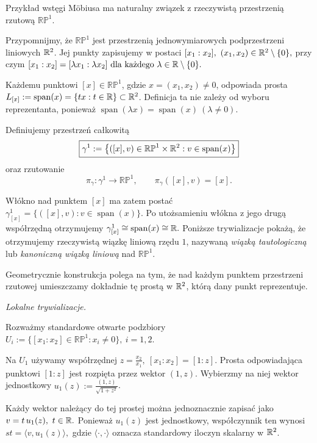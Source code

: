 \begin{przyklad}
\label{prz:tautologiczna-rp1}

Przykład wstęgi Möbiusa ma naturalny związek z rzeczywistą
przestrzenią rzutową $\mathbb{RP}^1$.

Przypomnijmy, że $\mathbb{RP}^1$ jest przestrzenią
jednowymiarowych podprzestrzeni liniowych $\mathbb{R}^2$.
Jej punkty zapisujemy w postaci
$
[x_1:x_2],
\ (x_1,x_2)\in\mathbb{R}^2\setminus\{0\},
$
przy czym
$
[x_1:x_2]=[\lambda x_1:\lambda x_2]
\ \text{dla każdego }\lambda\in\mathbb{R}\setminus\{0\}.
$


Każdemu punktowi $[x]\in\mathbb{RP}^1$,
gdzie $x=(x_1,x_2)\neq0$, odpowiada prosta $L_{[x]}:=\operatorname{span}(x) =\{tx:t\in\mathbb{R}\}\subset\mathbb{R}^2$.
Definicja ta nie zależy od wyboru reprezentanta,
ponieważ
$
\operatorname{span}(\lambda x)
=\operatorname{span}(x)
\ (\lambda\neq0).
$

Definiujemy przestrzeń całkowitą
\[
\boxed{
\gamma^1
:=
\bigl\{
([x],v)\in\mathbb{RP}^1\times\mathbb{R}^2:
v\in\operatorname{span}(x)
\bigr\}
}
\]
oraz rzutowanie
\[
\pi_\gamma\colon\gamma^1\longrightarrow\mathbb{RP}^1,
\qquad
\pi_\gamma([x],v)=[x].
\]

Włókno nad punktem $[x]$ ma zatem postać
$
\gamma^1_{[x]}
=
\bigl\{
([x],v):v\in\operatorname{span}(x)
\bigr\}.
$
Po utożsamieniu włókna z jego drugą współrzędną
otrzymujemy
$
\gamma^1_{[x]}\cong\operatorname{span}(x)\cong\mathbb{R}.
$
Poniższe trywializacje pokażą, że otrzymujemy
rzeczywistą wiązkę liniową rzędu $1$,
nazywaną \emph{wiązką tautologiczną}
lub \emph{kanoniczną wiązką liniową} nad $\mathbb{RP}^1$.

Geometrycznie konstrukcja polega na tym, że nad
każdym punktem przestrzeni rzutowej umieszczamy
dokładnie tę prostą w $\mathbb{R}^2$, którą dany punkt
reprezentuje.

\medskip
\emph{Lokalne trywializacje.}

Rozważmy standardowe otwarte podzbiory
$
U_i:=\{[x_1:x_2]\in\mathbb{RP}^1:x_i\neq0\},\ i=1,2.
$


Na $U_1$ używamy współrzędnej $z=\frac{x_2}{x_1}, \ [x_1:x_2]=[1:z]$.
Prosta odpowiadająca punktowi $[1:z]$
jest rozpięta przez wektor $(1,z)$.
Wybierzmy na niej wektor jednostkowy $u_1(z):=\frac{(1,z)}{\sqrt{1+z^2}}$.

Każdy wektor należący do tej prostej
można jednoznacznie zapisać jako
$
v=t\,u_1(z),
\ t\in\mathbb{R}.
$
Ponieważ $u_1(z)$ jest jednostkowy,
współczynnik ten wynosi
$s
t=\langle v,u_1(z)\rangle,
$
gdzie $\langle\cdot,\cdot\rangle$
oznacza standardowy iloczyn skalarny w $\mathbb{R}^2$.


\end{przyklad}

